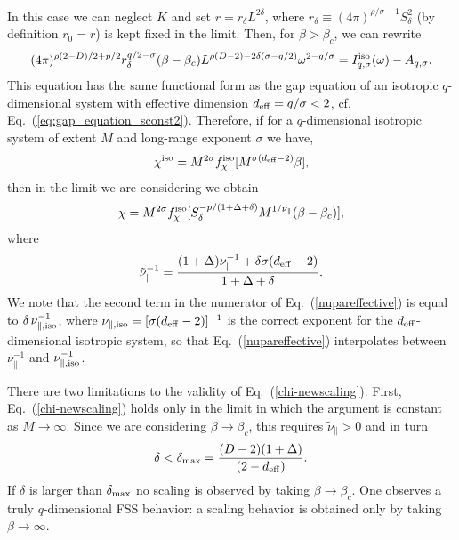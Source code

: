 \documentclass[a4paper,12pt]{article}
\begin{document}
In this case we can neglect $K$ and set $r = r_\delta 
L^{2\delta}$, where 
$r_\delta \equiv (4\pi)^{\rho/\sigma-1} S^2_\delta$  (by definition $r_0=r$) 
is kept fixed in the limit. Then, for $\beta > \beta_{c}$, we can rewrite 
\begin{eqnarray}
(4\pi)^{\rho(2-D)/2+p/2} r_\delta^{q/2-\sigma}
   (\beta-\beta_c) L^{\rho (D-2) - 2\delta(\sigma-q/2)}  \omega^{2-q/\sigma} = 
   I_{q,\sigma}^{\rm iso}(\omega) - A_{q,\sigma}.
\label{scaling-anomalo}
\end{eqnarray}
This equation has the same functional form as the gap equation of an
isotropic $q$-dimensional system with effective dimension 
$d_{\rm eff} = q/\sigma < 2$, 
cf. Eq.~(\ref{eq:gap_equation_sconst2}). Therefore, if for a $q$-dimensional 
isotropic system of extent $M$ and long-range exponent $\sigma$ we have,
\begin{eqnarray}
\chi^{\rm iso} = M^{2\sigma} f^{\rm iso}_{\chi} 
    [M^{\sigma (d_{\rm eff} - 2)} \beta],
\end{eqnarray}
then in the limit we are considering we obtain
\begin{eqnarray}
\chi = M^{2\sigma} f^{\rm iso}_{\chi} 
[S_{\delta}^{-p/(1+\Delta+\delta)} M^{1/{\tilde\nu_\|}} (\beta - \beta_c)] ,
\label{chi-newscaling}
\end{eqnarray}
where 
\begin{equation}
{\tilde\nu}^{-1}_\| = 
   {(1+\Delta)\nu^{-1}_\| + \delta\sigma(d_{\rm eff} - 2)\over 1+\Delta+\delta}.
\label{nupareffective}
\end{equation}
We note that the second term in the numerator of
Eq.~(\ref{nupareffective}) is equal to $\delta\, \nu^{-1}_{\|,{\rm iso}}$,
where $\nu_{\|,{\rm iso}} = [\sigma(d_{\rm eff} - 2)]^{-1}$ 
is the correct  exponent for the
$d_{\rm eff}$-dimensional isotropic system, so that 
Eq.~(\ref{nupareffective}) interpolates between 
${\nu}^{-1}_\|$ and $\nu^{-1}_{\|,{\rm iso}}$.

There are two limitations to the validity of Eq.~(\ref{chi-newscaling}).
First,
Eq.~(\ref{chi-newscaling}) holds only in the limit in which the 
argument is constant as $M\to \infty$. Since we are considering 
$\beta\to \beta_c$, this requires ${\tilde\nu}_\| > 0$ and in turn
\begin{equation}
\delta < \delta_{\rm max} = {(D-2) (1 + \Delta)\over (2 - d_{\rm eff})} .
\end{equation}
If $\delta$ is larger than $\delta_{\rm max}$ no scaling is observed 
by taking $\beta\to\beta_c$. One observes a truly $q$-dimensional 
FSS behavior: a scaling behavior is obtained only by taking $\beta\to\infty$.
\end{document}
